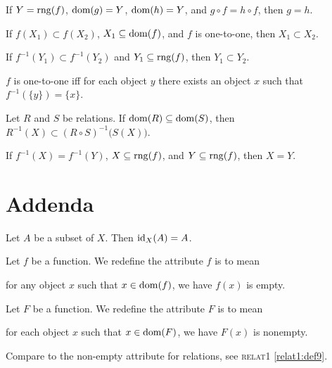 \documentclass{article}
\begin{document}
\begin{thm}
\item\label{funct1:86} If $Y=\operatorname{rng}(f)$, $\operatorname{dom}(g)=Y$, $\operatorname{dom}(h)=Y$, and
  $g\circ f=h\circ f$, then $g=h$.
\item\label{funct1:87} If $f(X_{1})\subset f(X_{2})$, $X_{1}\subseteq\operatorname{dom}(f)$,
  and $f$ is one-to-one, then $X_{1}\subset X_{2}$.
\item\label{funct1:88} If $f^{-1}(Y_{1})\subset f^{-1}(Y_{2})$ and $Y_{1}\subseteq\operatorname{rng}(f)$,
  then $Y_{1}\subset Y_{2}$.
\item\label{funct1:89} $f$ is one-to-one iff for each object $y$ there
  exists an object $x$ such that $f^{-1}(\{y\})=\{x\}$.
\item\label{funct1:90} Let $R$ and $S$ be relations. If $\operatorname{dom}(R)\subseteq\operatorname{dom}(S)$,
  then $R^{-1}(X)\subset(R\circ S)^{-1}\bigl(S(X)\bigr)$.
\item\label{funct1:91} If $f^{-1}(X)=f^{-1}(Y)$, $X\subseteq\operatorname{rng}(f)$, and
  $Y\subseteq\operatorname{rng}(f)$, then $X=Y$.
\end{thm}

\section*{Addenda}

\begin{thm}
\item\label{funct1:92} Let $A$ be a subset of $X$. Then $\operatorname{id}_{X}(A)=A$.
\end{thm}

\begin{definition}
Let $f$ be a function. We redefine the attribute $f$ is
 to mean
\begin{defn}
\item for any object $x$ such that $x\in\operatorname{dom}(f)$, we have $f(x)$ is empty.
\end{defn}
\end{definition}

\begin{definition}
Let $F$ be a function. We redefine the attribute $F$ is 
to mean
\begin{defn}
\item for each object $x$ such that $x\in\operatorname{dom}(F)$, we have $F(x)$ is nonempty.
\end{defn}
\end{definition}

\begin{remark}
Compare to the non-empty attribute for relations, see \textsc{relat1} \ref{relat1:def9}.
\end{remark}
\end{document}
